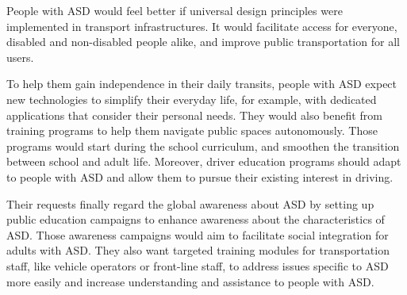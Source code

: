 People with ASD would feel better if universal design principles were implemented in transport infrastructures\cite{2020ExperiencesYoungAutistic}. It would facilitate access for everyone, disabled and non-disabled people alike, and improve public transportation for all users.

To help them gain independence in their daily transits, people with ASD expect new technologies to simplify their everyday life, for example, with dedicated applications that consider their personal needs. They would also benefit from training programs to help them navigate public spaces autonomously. Those programs would start during the school curriculum, and smoothen the transition between school and adult life\cite{2015DetourRightPlace}. Moreover, driver education programs should adapt to people with ASD and allow them to pursue their existing interest in driving\cite{2015DetourRightPlace}.

Their requests finally regard the global awareness about ASD by setting up public education campaigns to enhance awareness about the characteristics of ASD. Those awareness campaigns would aim to facilitate social integration for adults with ASD\cite{2015DetourRightPlace}. They also want targeted training modules for transportation staff, like vehicle operators or front-line staff, to address issues specific to ASD more easily and increase understanding and assistance to people with ASD\cite{2020ExperiencesYoungAutistic}.
